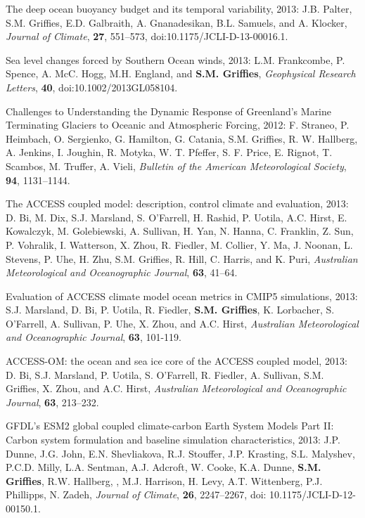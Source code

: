 \begin{etaremune}
\item The deep ocean buoyancy budget and its temporal variability,
  2013: J.B. Palter, S.M. Grif\/f\/ies, E.D. Galbraith,
  A. Gnanadesikan, B.L. Samuels, and A. Klocker, {\it Journal of
    Climate}, {\bf 27}, 551--573,
  doi:10.1175/JCLI-D-13-00016.1.

\item Sea level changes forced by Southern Ocean winds, 2013:
  L.M. Frankcombe, P. Spence, A. McC. Hogg, M.H. England, and {\bf
    S.M. Grif\/f\/ies}, {\it Geophysical Research Letters}, {\bf 40},
  doi:10.1002/2013GL058104.

\item Challenges to Understanding the Dynamic Response of Greenland's
  Marine Terminating Glaciers to Oceanic and Atmospheric Forcing,
  2012: F. Straneo, P. Heimbach, O. Sergienko, G. Hamilton,
  G. Catania, S.M. Grif\/f\/ies, R. W. Hallberg, A. Jenkins,
  I. Joughin, R. Motyka, W. T. Pfeffer, S. F. Price, E. Rignot,
  T. Scambos, M. Truffer, A. Vieli, {\it Bulletin of the American
    Meteorological Society}, {\bf 94}, 1131--1144.

\item The ACCESS coupled model: description, control climate and
  evaluation, 2013: D. Bi, M. Dix, S.J. Marsland, S. O'Farrell,
  H. Rashid, P. Uotila, A.C. Hirst, E. Kowalczyk, M. Golebiewski,
  A. Sullivan, H. Yan, N. Hanna, C. Franklin, Z. Sun, P. Vohralik,
  I. Watterson, X. Zhou, R. Fiedler, M. Collier, Y. Ma, J. Noonan,
  L. Stevens, P. Uhe, H. Zhu, S.M. Grif\/f\/ies, R. Hill,
  C. Harris, and K. Puri, {\it Australian Meteorological and
    Oceanographic Journal}, {\bf 63}, 41--64.

\item Evaluation of ACCESS climate model ocean metrics in CMIP5
  simulations, 2013: S.J. Marsland, D. Bi, P. Uotila, R. Fiedler, {\bf
    S.M. Grif\/f\/ies}, K. Lorbacher, S. O'Farrell, A. Sullivan,
  P. Uhe, X. Zhou, and A.C. Hirst, {\it Australian Meteorological and
    Oceanographic Journal}, {\bf 63}, 101-119.

\item ACCESS-OM: the ocean and sea ice core of the ACCESS coupled
  model, 2013: D. Bi, S.J. Marsland, P. Uotila, S. O'Farrell,
  R. Fiedler, A. Sullivan, S.M. Grif\/f\/ies, X. Zhou, and
  A.C. Hirst, {\it Australian Meteorological and Oceanographic
    Journal}, {\bf 63}, 213--232.

\item GFDL’s ESM2 global coupled climate-carbon Earth System Models
  Part II: Carbon system formulation and baseline simulation
  characteristics, 2013: J.P. Dunne, J.G. John, E.N. Shevliakova,
  R.J. Stouffer, J.P. Krasting, S.L. Malyshev, P.C.D. Milly,
  L.A. Sentman, A.J. Adcroft, W. Cooke, K.A. Dunne, {\bf
    S.M. Grif\/f\/ies}, R.W. Hallberg, , M.J. Harrison, H. Levy,
  A.T. Wittenberg, P.J. Phillipps, N. Zadeh, {\it Journal of Climate},
  {\bf 26}, 2247--2267, doi: 10.1175/JCLI-D-12-00150.1.


\end{etaremune}
